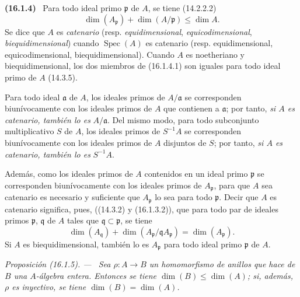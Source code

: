 \documentclass[10pt,oneside]{book}
\makeatletter
\newcommand{\setmanualcurrentlabel}[1]{\def\@currentlabel{#1}}
\newenvironment{env}[1][]{\setmanualcurrentlabel{#1}\par\medskip\noindent\textbf{(#1)}\ }{\par}
\newenvironment{proposition}[1][]{%
  \setmanualcurrentlabel{#1}\par\medskip\noindent\itshape Proposición (#1). ---\ }{\par}
\makeatother
\begin{document}
\begin{env}[16.1.4]
\label{0.16.1.4-es}
Para todo ideal primo $\mathfrak{p}$ de $A$, se tiene (14.2.2.2)
\[
\label{0.16.1.4.1-es}
  \dim(A_{\mathfrak{p}})+\dim(A/\mathfrak{p})\leq\dim A.
\tag{16.1.4.1}
\]
Se dice que $A$ es \emph{catenario} (resp. \emph{equidimensional}, \emph{equicodimensional},
\emph{biequidimensional}) cuando $\operatorname{Spec}(A)$ es catenario (resp.
equidimensional,
equicodimensional, biequidimensional). Cuando $A$ es noetheriano y
biequidimensional, los dos miembros de (16.1.4.1) son iguales para todo ideal
primo de $A$ (14.3.5).

Para todo ideal $\mathfrak{a}$ de $A$, los ideales primos de
$A/\mathfrak{a}$ se corresponden biunívocamente con los ideales primos de $A$
que contienen a $\mathfrak{a}$; por tanto, \emph{si $A$ es catenario, también lo es}
$A/\mathfrak{a}$. Del mismo modo, para todo subconjunto multiplicativo $S$ de
$A$, los ideales primos de $S^{-1}A$ se corresponden biunívocamente con los
ideales primos de $A$ disjuntos de $S$; por tanto, \emph{si $A$ es catenario, también
lo es} $S^{-1}A$.

Además, como los ideales primos de $A$ contenidos en un ideal primo
$\mathfrak{p}$ se corresponden biunívocamente con los ideales primos de
$A_{\mathfrak{p}}$, para que $A$ sea catenario es necesario y suficiente que
$A_{\mathfrak{p}}$ lo sea para todo $\mathfrak{p}$. Decir que $A$ es catenario
significa, pues, ((14.3.2) y (16.1.3.2)), que para todo par de ideales primos
$\mathfrak{p}$, $\mathfrak{q}$ de $A$ tales que
$\mathfrak{q}\subset\mathfrak{p}$, se tiene
\[
\label{0.16.1.4.2-es}
  \dim(A_{\mathfrak{q}})
  +\dim(A_{\mathfrak{p}}/\mathfrak{q}A_{\mathfrak{p}})
  =\dim(A_{\mathfrak{p}}).
\tag{16.1.4.2}
\]
Si $A$ es biequidimensional, también lo es $A_{\mathfrak{p}}$ para todo ideal
primo $\mathfrak{p}$ de $A$.
\end{env}

\begin{proposition}[16.1.5]
\label{0.16.1.5-es}
Sea $\rho:A\to B$ un homomorfismo de anillos que hace de $B$ una $A$-álgebra
entera. Entonces se tiene $\dim(B)\leq\dim(A)$; si, además, $\rho$ es
inyectivo, se tiene $\dim(B)=\dim(A)$.
\end{proposition}
\end{document}

